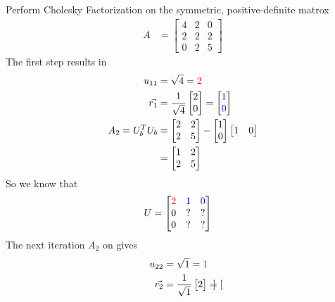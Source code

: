 \begin{exmp}
Perform Cholesky Factorization on the symmetric, positive-definite matrox
\begin{align*}
A &=
\begin{bmatrix}
4 & 2 & 0 \\
2 & 2 & 2 \\
0 & 2 & 5 
\end{bmatrix}
\end{align*}
The first step results in
\begin{align*}
u_{11} &= \sqrt{4} = \textcolor{red}{2} \\
\vec{r_1} &= \frac{1}{\sqrt{4}}
\begin{bmatrix}
2 \\
0
\end{bmatrix}
= 
\begin{bmatrix}
\textcolor{blue}{1} \\
\textcolor{blue}{0}
\end{bmatrix} \\
A_2 = U_b^T U_b &= 
\begin{bmatrix}
2 & 2 \\
2 & 5
\end{bmatrix}
-
\begin{bmatrix}
1 \\
0
\end{bmatrix}
\begin{bmatrix}
1 & 0
\end{bmatrix} \\
&= \begin{bmatrix}
1 & 2 \\
2 & 5 
\end{bmatrix}
\end{align*}
So we know that
\begin{align*}
U &=
\begin{bmatrix}
\textcolor{red}{2} & \textcolor{blue}{1} & \textcolor{blue}{0} \\
0 & ? & ? \\
0 & ? & ? \\
\end{bmatrix}
\end{align*}
The next iteration $A_2$ on gives
\begin{align*}
u_{22} &= \sqrt{1} = \textcolor{red}{1} \\  
\vec{r_2} &= \frac{1}{\sqrt{1}}
\begin{bmatrix}
2
\end{bmatrix}
=
\begin{bmatrix}

\end{bmatrix}
\end{align*}
\end{exmp}
